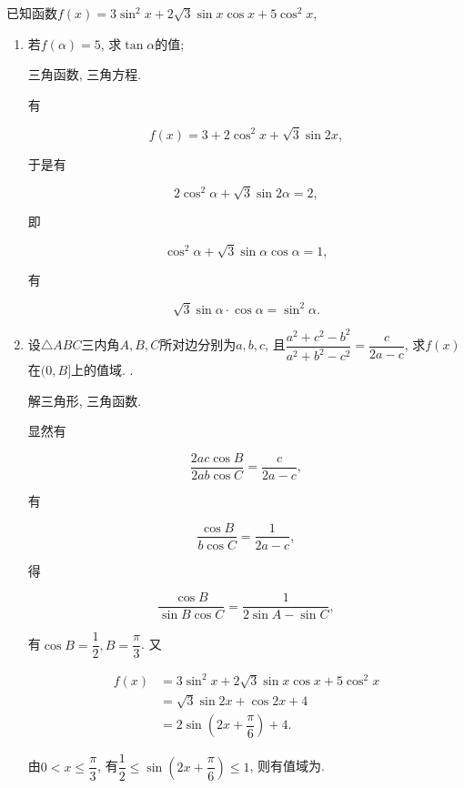 \documentclass[8pt]{article}
\begin{document}
		 已知函数\(f(x) = 3 \sin^2 x + 2\sqrt{3} \sin x \cos x + 5 \cos^2 x\),

		\begin{enumerate}[label = \calword{(\arabic*)}]
			\item 若\(f(\alpha) = 5\), 求\(\tan \alpha\)的值; 

				 三角函数, 三角方程.

				有

				\[f(x) = 3 + 2 \cos^2 x + \sqrt{3} \sin 2x,\]

				于是有

				\[2\cos^2 \alpha + \sqrt{3} \sin 2\alpha = 2,\]

				即

				\[\cos^2 \alpha + \sqrt{3} \sin \alpha \cos \alpha = 1,\]

				有

				\[\sqrt{3} \sin \alpha \cdot \cos \alpha = \sin^2 \alpha.\]


			\item 设\(\triangle ABC\)三内角\(A, B, C\)所对边分别为\(a, b, c\), 且\(\dfrac{a^2 + c^2 - b^2}{a^2 + b^2 - c^2} = \dfrac{c}{2a - c}\), 求\(f(x)\)在\((0, B]\)上的值域. \answord{\([5, 6]\)}.

				 解三角形, 三角函数.

				显然有

				\[
					\frac{2ac \cos B}{2ab \cos C} = \frac{c}{2a-c},
				\]

				有

				\[
					\frac{\cos B}{b \cos C} = \frac{1}{2a-c},
				\]

				得

				\[
					\frac{\cos B}{\sin B \cos C} = \frac{1}{2 \sin A - \sin C},
				\]

				有\(\cos B = \dfrac{1}{2}, B = \dfrac{\pi}{3}\). 又

				\begin{align*}
					f(x) &= 3\sin^2 x + 2\sqrt{3} \sin x \cos x + 5 \cos^2 x\\
					     &= \sqrt{3} \sin 2x + \cos 2x + 4 \\
					     &= 2 \sin \left(2x + \dfrac{\pi}{6}\right) + 4.
				\end{align*}

				由\(0 < x \leq \dfrac{\pi}{3}\), 有\(\dfrac{1}{2} \leq \sin \left(2x + \dfrac{\pi}{6}\right) \leq 1\), 则有值域为\answord{\([5, 6]\)}.

		\end{enumerate}
		~\\
\end{document}
